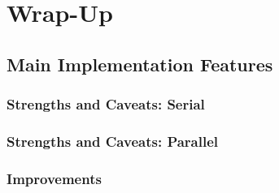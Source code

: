\section{Wrap-Up}
\subsection{Main Implementation Features}
\begin{frame}
	\frametitle{Strengths and Caveats: Serial}
\end{frame}

\begin{frame}
\frametitle{Strengths and Caveats: Parallel}
\end{frame}

\begin{frame}
\frametitle{Improvements}
\end{frame}
